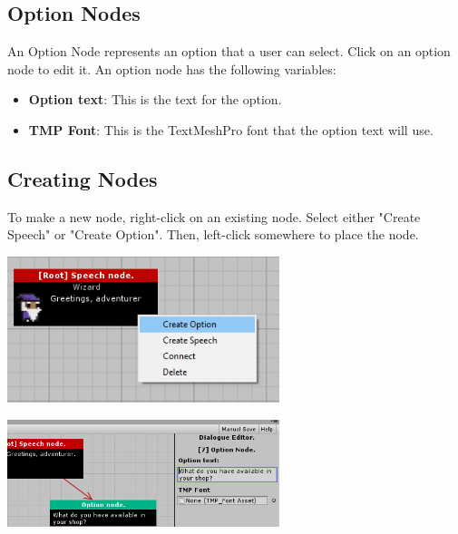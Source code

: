 \documentclass[a4paper,12pt]{article}
\begin{document}
\bigskip

\subsection{Option Nodes}
An Option Node represents an option that a user can select.
\newline
Click on an option node to edit it. An option node has the following variables:

\begin{itemize}
\setlength\itemsep{1pt}
	\item \textbf{Option text}: This is the text for the option.
	\item \textbf{TMP Font}: This is the TextMeshPro font that the option text will use.
\end{itemize}

\newpage

\subsection{Creating Nodes}

To make a new node, right-click on an existing node. Select either "Create Speech" or "Create Option". Then, left-click somewhere to place the node.

\bigskip

\begin{minipage}[c]{0.45\textwidth}
\centering
\includegraphics[width=225pt, keepaspectratio]{img/CreateNode.png}
\end{minipage}
\hfill
\begin{minipage}[c]{0.45\textwidth}
\centering
\includegraphics[width=225pt, keepaspectratio]{img/PlaceNode.png}
\end{minipage}
\end{document}
